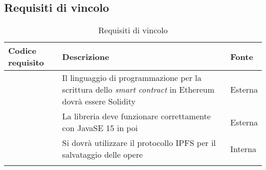 \subsection{Requisiti di vincolo}
\begin{longtabu}{|X[0.8,c]|X[3,c]|X[0.5,c]|}

  \hline 

  \textbf{Codice requisito} & \textbf{Descrizione} & \textbf{Fonte} \\

  \hline

   \label{rvin:solidity} & Il linguaggio di programmazione per la scrittura dello \textit{smart contract} in Ethereum dovrà essere Solidity & Esterna \\ 
  
  \hline

   \label{rvin:java-version} & La libreria deve funzionare correttamente con JavaSE 15 in poi & Esterna \\
  
  \hline

   \label{rvin:ipfs} & Si dovrà utilizzare il protocollo IPFS per il salvataggio delle opere & Interna \\
  
  \hline

  \caption{Requisiti di vincolo}
\end{longtabu}
